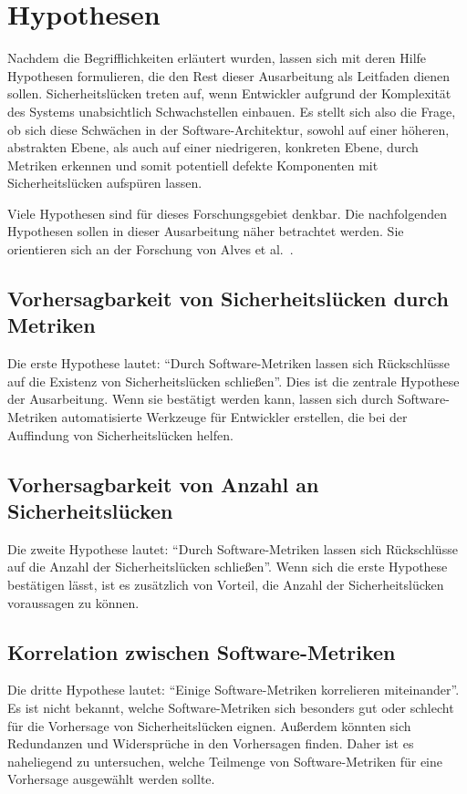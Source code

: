 \section{Hypothesen}
\label{sec:hypothesen}
Nachdem die Begrifflichkeiten erläutert wurden, lassen sich mit deren Hilfe Hypothesen formulieren, die den Rest dieser Ausarbeitung als Leitfaden dienen sollen.
Sicherheitslücken treten auf, wenn Entwickler aufgrund der Komplexität des Systems unabsichtlich Schwachstellen einbauen.
Es stellt sich also die Frage, ob sich diese Schwächen in der Software-Architektur,
sowohl auf einer höheren, abstrakten Ebene, als auch auf einer niedrigeren, konkreten Ebene,
durch Metriken erkennen und somit potentiell defekte Komponenten mit Sicherheitslücken aufspüren lassen.

Viele Hypothesen sind für dieses Forschungsgebiet denkbar.
Die nachfolgenden Hypothesen sollen in dieser Ausarbeitung näher betrachtet werden.
Sie orientieren sich an der Forschung von Alves et al.~\cite{alves_et_al}.

\subsection{Vorhersagbarkeit von Sicherheitslücken durch Metriken}
Die erste Hypothese lautet: "`Durch Software-Metriken lassen sich Rückschlüsse auf die Existenz von Sicherheitslücken schließen"'.
Dies ist die zentrale Hypothese der Ausarbeitung.
Wenn sie bestätigt werden kann, lassen sich durch Software-Metriken automatisierte Werkzeuge für Entwickler erstellen, die bei der Auffindung von Sicherheitslücken helfen.

\subsection{Vorhersagbarkeit von Anzahl an Sicherheitslücken}
Die zweite Hypothese lautet: "`Durch Software-Metriken lassen sich Rückschlüsse auf die Anzahl der Sicherheitslücken schließen"'.
Wenn sich die erste Hypothese bestätigen lässt, ist es zusätzlich von Vorteil, die Anzahl der Sicherheitslücken voraussagen zu können.

\subsection{Korrelation zwischen Software-Metriken}
Die dritte Hypothese lautet: "`Einige Software-Metriken korrelieren miteinander"'.
Es ist nicht bekannt, welche Software-Metriken sich besonders gut oder schlecht für die Vorhersage von Sicherheitslücken eignen.
Außerdem könnten sich Redundanzen und Widersprüche in den Vorhersagen finden.
Daher ist es naheliegend zu untersuchen, welche Teilmenge von Software-Metriken für eine Vorhersage ausgewählt werden sollte.
